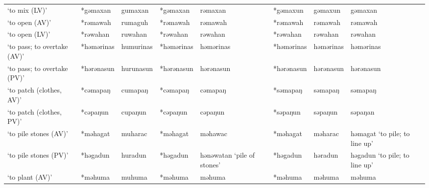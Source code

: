 \begin{landscape}
\begin{longtable}[c]{@{}p{3cm}<{\raggedright}p{2.75cm}<{\raggedright}p{2.75cm}<{\raggedright}p{2.75cm}<{\raggedright}p{2.75cm}<{\raggedright}p{2.75cm}<{\raggedright}p{2.75cm}<{\raggedright}p{2.75cm}<{\raggedright}@{}}
`to mix (LV)'                                        & *gəmaxan           & gumaxan                        & *gəmaxan           & rəmaxan                    & *gəmaxun         & gəmaxun                  & gəmaxan                           \\
`to open (AV)'                                       & *rəmawah           & rumaguh                        & *rəmawah           & rəmawah                    & *rəmawah         & rəmawah                  & rəmawah                           \\
`to open (LV)'                                       & *rəwahan           & ruwahan                        & *rəwahan           & rəwahan                    & *rəwahan         & rəwahan                  & rəwahan                           \\
`to pass; to overtake (AV)'                          & *həmərinas         & humurinas                      & *həmərinas         & həmərinas                  & *həmərinas       & həmərinas                & həmərinas                         \\
`to pass; to overtake (PV)'                          & *hərənasun         & hurunasun                      & *hərənasun         & hərənasun                  & *hərənasun       & hərənasun                & hərənasun                         \\
`to patch (clothes, AV)'                             & *cəmapaŋ           & cumapaŋ                        & *cəmapaŋ           & cəmapaŋ                    & *səmapaŋ         & səmapaŋ                  & səmapaŋ                           \\
`to patch (clothes, PV)'                             & *cəpaŋun           & cupaŋun                        & *cəpaŋun           & cəpaŋun                    & *səpaŋun         & səpaŋun                  & səpaŋan                           \\
`to pile stones (AV)'                                & *məhagat           & muharac                        & *məhagat           & məhawac                    & *məhagat         & məharac                  & həmagat `to pile; to line up'     \\
`to pile stones (PV)'                                & *həgadun           & huradun                        & *həgadun           & hənəwatan `pile of stones' & *həgadun         & həradun                  & həgadun `to pile; to line up'     \\
`to plant (AV)'                                      & *məhuma            & muhuma                         & *məhuma            & məhuma                     & *məhuma          & məhuma                   & məhuma                            \\

\end{longtable}
\end{landscape}
